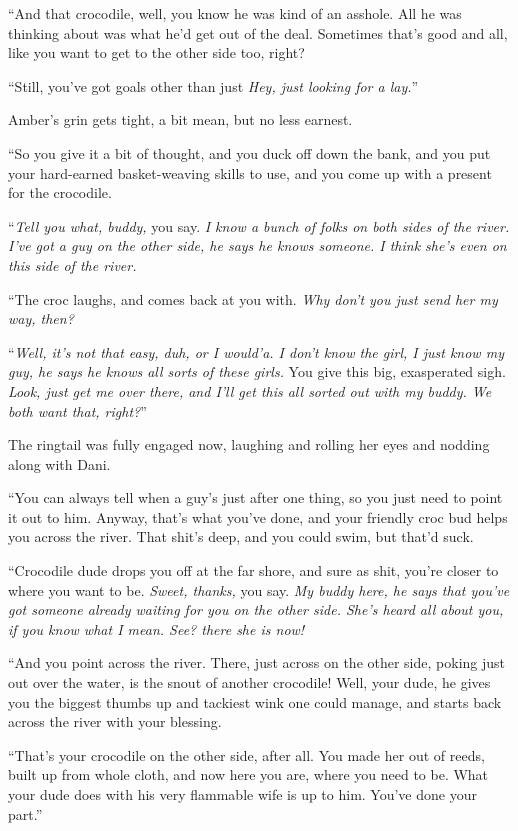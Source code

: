 ``And that crocodile, well, you know he was kind of an asshole. All he was thinking about was what he'd get out of the deal. Sometimes that's good and all, like you want to get to the other side too, right?

``Still, you've got goals other than just \emph{Hey, just looking for a lay.}''

Amber's grin gets tight, a bit mean, but no less earnest.

``So you give it a bit of thought, and you duck off down the bank, and you put your hard-earned basket-weaving skills to use, and you come up with a present for the crocodile.

``\emph{Tell you what, buddy,} you say. \emph{I know a bunch of folks on both sides of the river. I've got a guy on the other side, he says he knows someone. I think she's even on this side of the river.}

``The croc laughs, and comes back at you with. \emph{Why don't you just send her my way, then?}

``\emph{Well, it's not that easy, duh, or I would'a. I don't know the girl, I just know my guy, he says he knows all sorts of these girls.} You give this big, exasperated sigh. \emph{Look, just get me over there, and I'll get this all sorted out with my buddy. We both want that, right?}''

The ringtail was fully engaged now, laughing and rolling her eyes and nodding along with Dani.

``You can always tell when a guy's just after one thing, so you just need to point it out to him. Anyway, that's what you've done, and your friendly croc bud helps you across the river. That shit's deep, and you could swim, but that'd suck.

``Crocodile dude drops you off at the far shore, and sure as shit, you're closer to where you want to be. \emph{Sweet, thanks,} you say. \emph{My buddy here, he says that you've got someone already waiting for you on the other side. She's heard all about you, if you know what I mean. See? there she is now!}

``And you point across the river. There, just across on the other side, poking just out over the water, is the snout of another crocodile! Well, your dude, he gives you the biggest thumbs up and tackiest wink one could manage, and starts back across the river with your blessing.

``That's your crocodile on the other side, after all. You made her out of reeds, built up from whole cloth, and now here you are, where you need to be. What your dude does with his very flammable wife is up to him. You've done your part.''

